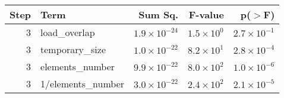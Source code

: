 \begin{table}[ht]
\centering
\begin{tabular}{rlrrr}
  \toprule
Step & Term & Sum Sq. & F-value & p($>$F) \\ 
  \midrule
3 & load\_overlap & $1.9 \times 10^{-24}$ & $1.5 \times 10^{0}$ & $2.7 \times 10^{-1}$ \\ 
  3 & temporary\_size & $1.0 \times 10^{-22}$ & $8.2 \times 10^{1}$ & $2.8 \times 10^{-4}$ \\ 
  3 & elements\_number & $9.9 \times 10^{-22}$ & $8.0 \times 10^{2}$ & $1.0 \times 10^{-6}$ \\ 
  3 & 1/elements\_number & $3.0 \times 10^{-22}$ & $2.4 \times 10^{2}$ & $2.1 \times 10^{-5}$ \\ 
   \bottomrule
\end{tabular}
\end{table}

